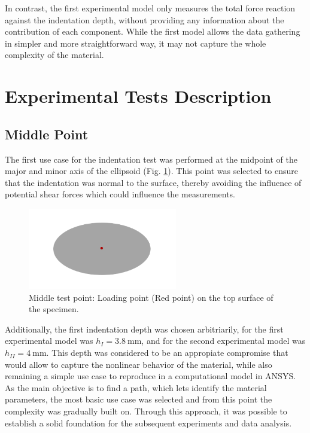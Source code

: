 In contrast, the first experimental model only measures the total force reaction 
against the indentation depth, without providing any information about the contribution 
of each component. While the first model allows the data 
gathering in simpler and more straightforward way, it may not capture 
the whole complexity of the material.

\section{Experimental Tests Description}

\subsection*{Middle Point}
\label{subsection:midpoint}
The first use case for the indentation test was performed at the midpoint 
of the major and minor axis of the ellipsoid (Fig. \ref{fig:midpoint}). This point was selected 
to ensure that the indentation was normal to the surface, thereby avoiding 
the influence of potential shear forces which could influence the 
measurements.

\begin{figure}%
    \centering
   \quad
   \includegraphics[width=6.5cm]{Images/Experiment/specimenmidp.png}%
   \caption{Middle test point: Loading point (Red point) on the top surface of the specimen.}%
   \label{fig:midpoint}%
\end{figure}

Additionally, the first indentation depth was chosen arbitriarily, for the first 
experimental model was $h_{I} = \SI{3.8}{\milli \m}$, and for the second 
experimental model was $h_{II} = \SI{4}{\milli \m}$. This depth was considered 
to be an appropiate compromise that would allow to capture the nonlinear 
behavior of the material, while also remaining a simple use case to 
reproduce in a computational model in ANSYS.\\

As the main objective is to find a path, which lets identify the material 
 parameters, the most basic use case was selected and from this point 
the complexity was gradually built on. Through this approach, it was possible 
to establish a solid foundation for the subsequent experiments and data analysis.



